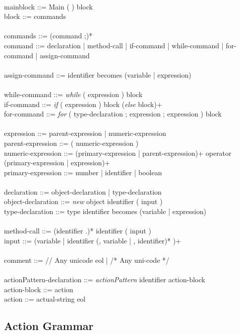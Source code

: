 {\\
mainblock ::= Main ( ) block \\
block ::= { commands } \\
\\
commands ::= (command ;)* \\
command ::= declaration | method-call | if-command | while-command | for-command | assign-command \\
\\
assign-command ::= identifier becomes  (variable | expression) \\
\\
while-command ::= \textit{while} ( expression ) block \\
if-command ::= \textit{if} ( expression ) block (\textit{else} block)+ \\
for-command ::= \textit{for} ( type-declaration ; expression ; expression ) block \\
\\
expression ::= parent-expression | numeric-expression \\
parent-expression ::= ( numeric-expression ) \\
numeric-expression ::= (primary-expression | parent-expression)+ operator (primary-expression | expression)+ \\
primary-expression ::= number | identifier | boolean \\
\\
declaration ::= object-declaration | type-declaration \\
object-declaration ::= \textit{new} object identifier ( input ) \\
type-declaration ::= type identifier becomes (variable | expression) \\
\\
method-call ::= (identifier .)* identifier ( input ) \\
input ::= (variable | identifier (, variable | , identifier)* )+ \\
\\
comment ::= // Any unicode eol | /* Any uni-code */ \\
\\
actionPattern-declaration ::= \textit{actionPattern} identifier action-block \\
action-block ::= { action } \\
action ::= actual-string eol


\subsection{Action Grammar}

}

